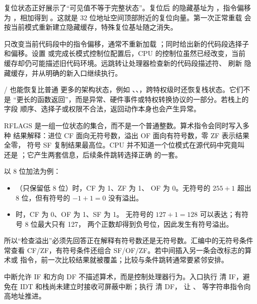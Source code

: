 复位状态正好展示了“可见值不等于完整状态”。复位后  的隐藏基址为
，指令偏移为 ，相加得到
。这就是 32 位地址空间顶部附近的复位向量。第一次正常重载
 会按当前模式重新建立隐藏缓存，特殊复位基址随之消失。

%
只改变当前代码段中的指令偏移，通常不重新加载
；同时给出新的代码段选择子和偏移。设置
 或完成长模式控制位配置后，CPU 的控制位虽然已经改变，当前
 缓存却仍可能描述旧代码环境。远跳转让处理器检查新的代码段描述符、
刷新  隐藏缓存，并从明确的新入口继续执行。

/ 也能恢复比普通  更多的架构状态，例如
、、，跨特权级时还恢复栈状态。它们不是
“更长的函数返回”，而是异常、硬件事件或特权转换协议的一部分。若栈上的字段
顺序、选择子或权限不合法，返回动作本身也会产生异常。

RFLAGS 是一组一位状态的集合，而不是一个普通整数。算术指令会同时写入多种
结果解释：进位 CF 面向无符号数，溢出 OF 面向有符号数，零 ZF 表示结果全零，
符号 SF 复制结果最高位。CPU 并不知道一个位模式在源代码中究竟叫
 还是 ；它产生两套信息，后续条件跳转选择正确
的一套。

以 8 位加法为例：

\begin{itemize}[leftmargin=2em]
  \item {}（只保留低 8 位）时，CF 为 1、ZF 为 1、
        OF 为 0。无符号的 \(255+1\) 超出 8 位，但有符号的
        \(-1+1=0\) 没有溢出。
  \item {} 时，CF 为 0、OF 为 1、SF 为 1。
        无符号的 \(127+1=128\) 可以表达；有符号 8 位最大只有 127，
        两个正数却得到负号位，因此发生有符号溢出。
\end{itemize}

所以“检查溢出”必须先回答正在解释有符号数还是无符号数。汇编中的无符号条件
常查看 CF/ZF，有符号条件还组合 SF/OF/ZF。若中间插入另一条会改标志的算术或
 指令，前一次比较结果就被覆盖；比较与条件跳转通常要紧邻安排。

中断允许 IF 和方向 DF 不描述算术，而是控制处理器行为。入口执行 
清 IF，避免在 IDT 和栈尚未建立时接收可屏蔽中断；执行  清 DF，
让 、 等字符串指令向高地址推进。

